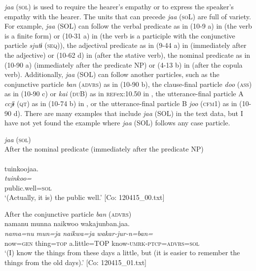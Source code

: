 \textit{jaa} (\textsc{sol}) is used to require the hearer’s empathy or to express the speaker’s empathy with the hearer. The units that can precede \textit{jaa} (\textsc{so}L) are full of variety. For example, \textit{jaa} (SOL) can follow the verbal predicate as in (10-9 a) in  (the verb is a finite form) or (10-31 a) in  (the verb is a participle with the conjunctive particle \textit{sjutɨ} (\textsc{seq})), the adjectival predicate as in (9-44 a) in  (immediately after the adjective) or (10-62 d) in  (after the stative verb), the nominal predicate as in (10-90 a) (immediately after the predicate NP) or (4-13 b) in  (after the copula verb). Additionally, \textit{jaa} (SOL) can follow another particles, such as the conjunctive particle \textit{ban} (\textsc{advrs}) as in (10-90 b), the clause-final particle \textit{doo} (\textsc{ass}) as in (10-90 c) or \textit{kai} (\textsc{du}B) as in \textsc{ref}{ex:10.50} in , the utterance-final particle A \textit{ccjɨ} (\textsc{qt}) as in (10-74 b) in , or the utterance-final particle B \textit{joo} (\textsc{cfm}1) as in (10-90 d). There are many examples that include \textit{jaa} (SOL) in the text data, but I have not yet found the example where \textit{jaa} (SOL) follows any case particle.

\ea\label{ex:10.90}   \textit{jaa} (\textsc{sol})\\
  \ea After the nominal predicate (immediately after the predicate NP)\\\\
      \glll    tuinkoojaa.\\
    \textit{tuinkoo=}\\
    public.well=\textsc{sol}\\
  \glt     ‘(Actually, it is) the public well.’ [Co: 120415\_00.txt]

  \ex After the conjunctive particle \textit{ban} (\textsc{advrs})\\
      \glll    namanu  munna  naikwoo  wakajunban.jaa.\\
    \textit{nama=nu}  \textit{mun=ja}  \textit{naikwa=ja}  \textit{wakar-jur-n=ban=}\\
    now=\textsc{gen}  thing=\textsc{top}  a.little=TOP  know-\textsc{umrk}-\textsc{ptcp}=\textsc{advrs}=\textsc{sol}\\
  \glt     ‘(I) know the things from these days a little, but (it is easier to remember the things from the old days).’ [Co: 120415\_01.txt]

